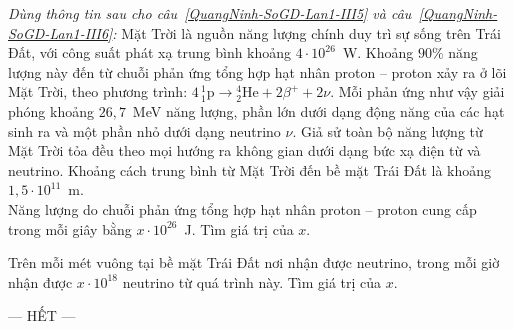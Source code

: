 	\begin{ex}%
		\label{QuangNinh-SoGD-Lan1-III5}
		\textit{Dùng thông tin sau cho câu~\ref{QuangNinh-SoGD-Lan1-III5} và câu~\ref{QuangNinh-SoGD-Lan1-III6}:} Mặt Trời là nguồn năng lượng chính duy trì sự sống trên Trái Đất, với công suất phát xạ trung bình khoảng $4\cdot 10^{26}$~W. Khoảng $90\%$ năng lượng này đến từ chuỗi phản ứng tổng hợp hạt nhân proton -- proton xảy ra ở lõi Mặt Trời, theo phương trình: $4\,{}^1_1\text{p}\to{}^4_2\text{He}+2\beta^++2\nu$. Mỗi phản ứng như vậy giải phóng khoảng $26{,}7$~MeV năng lượng, phần lớn dưới dạng động năng của các hạt sinh ra và một phần nhỏ dưới dạng neutrino $\nu$. Giả sử toàn bộ năng lượng từ Mặt Trời tỏa đều theo mọi hướng ra không gian dưới dạng bức xạ điện từ và neutrino. Khoảng cách trung bình từ Mặt Trời đến bề mặt Trái Đất là khoảng $1{,}5\cdot 10^{11}$~m.\\
		Năng lượng do chuỗi phản ứng tổng hợp hạt nhân proton -- proton cung cấp trong mỗi giây bằng $x\cdot 10^{26}$~J. Tìm giá trị của $x$.
		\par
	\end{ex}

	\begin{ex}%
		\label{QuangNinh-SoGD-Lan1-III6}
		Trên mỗi mét vuông tại bề mặt Trái Đất nơi nhận được neutrino, trong mỗi giờ nhận được $x\cdot 10^{18}$ neutrino từ quá trình này. Tìm giá trị của $x$.
		\par
	\end{ex}

	\centerline{--- HẾT ---}


